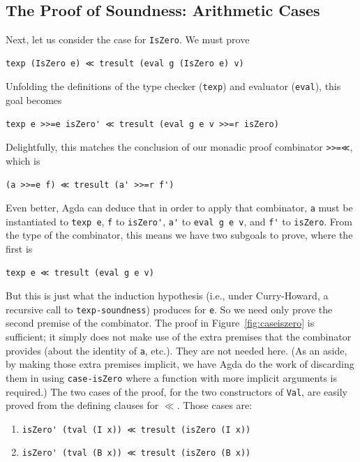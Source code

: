 \documentclass[acmsmall,screen,review]{acmart}
\begin{document}
\subsection{The Proof of Soundness: Arithmetic Cases}

Next, let us consider the case for \verb|IsZero|.  We must prove
\begin{verbatim}
texp (IsZero e) ≪ tresult (eval g (IsZero e) v)
\end{verbatim}
\noindent Unfolding the definitions of the type checker (\verb|texp|) and evaluator (\verb|eval|), this goal becomes

\begin{verbatim}
texp e >>=e isZero' ≪ tresult (eval g e v >>=r isZero)
\end{verbatim}

\noindent Delightfully, this matches the conclusion of our monadic proof combinator \verb|>>=≪|, which
is 
\begin{verbatim}
(a >>=e f) ≪ tresult (a' >>=r f')
\end{verbatim}
\noindent Even better, Agda can deduce that in order to apply that combinator, \verb|a| must be instantiated to
\verb|texp e|, \verb|f| to \verb|isZero'|, \verb|a'| to \verb|eval g e v|, and \verb|f'| to \verb|isZero|.
From the type of the combinator, this means we have two subgoals to prove, where the first is
\begin{verbatim}
texp e ≪ tresult (eval g e v)
\end{verbatim}
\noindent But this is just what the induction hypothesis (i.e., under
Curry-Howard, a recursive call to \verb|texp-soundness|) produces for
\verb|e|.  So we need only prove the second premise of the combinator.
The proof in Figure~\ref{fig:caseiszero} is sufficient; it simply does
not make use of the extra premises that the combinator provides (about
the identity of \verb|a|, etc.).  They are not needed here.  (As an
aside, by making those extra premises implicit, we have Agda do the
work of discarding them in using \verb|case-isZero| where a function
with more implicit arguments is required.) The two cases of the proof,
for the two constructors of \verb|Val|, are easily proved from the
defining clauses for $\ll$.  Those cases are:
\begin{enumerate}
\item \verb|isZero' (tval (I x)) ≪ tresult (isZero (I x))|
\item \verb|isZero' (tval (B x)) ≪ tresult (isZero (B x))|
\end{enumerate}
\end{document}
